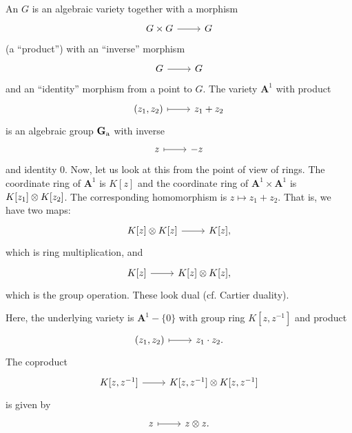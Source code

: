 \documentclass [11 pt, oneside] {article}
\begin{document}
\begin{example}\label{}
An  $G$ is an algebraic variety together with a morphism 
\[
\begin{tikzcd}
G\times G\ar[r]&G
\end{tikzcd}
\]
(a ``product'') with an ``inverse'' morphism
\[
\begin{tikzcd}
G\ar[r]&G
\end{tikzcd}
\]
 and an ``identity'' morphism from a point to $G$. The variety $\mathbf{A}^1$ with product
\[
\begin{tikzcd}
(z_1,z_2)\ar[r,mapsto]& z_1+z_2
\end{tikzcd}
\]
is an algebraic group $\mathbf G\textsubscript{a}$ with inverse
\[
\begin{tikzcd}
z\ar[r,mapsto]&-z
\end{tikzcd}
\]
and identity $0$. 
Now, let us look at this from the point of view of rings. 
The coordinate ring of $\mathbf{A}^1$ is $K[z]$ and the coordinate ring of $\mathbf{A}^1\times \mathbf{A}^1$ is $K[z_1]\otimes K[z_2]$. The corresponding homomorphism is $z\longmapsto z_1+z_2$. That is, we have two maps:
\[
\begin{tikzcd}
K[z]\tensor K[z]\ar[r]& K[z],
\end{tikzcd}
\]
which is ring multiplication, and 
\[
\begin{tikzcd}
K[z]\ar[r]& K[z]\tensor K[z],
\end{tikzcd}
\] 
which is the group operation. These look dual (cf. Cartier duality).
\end{example}

\begin{example}\label{}
Here, the underlying variety is $\mathbf{A}^1 - \{0\}$ with group ring $K[z,z^{-1}]$ and product 
\[
\begin{tikzcd}
(z_1,z_2)\ar[r,mapsto]& z_1\cdot z_2.
\end{tikzcd}
\]
The coproduct
\[
\begin{tikzcd}
K[z,z^{-1}] \ar[r]& K[z,z^{-1}]\tensor K[z,z^{-1}]
\end{tikzcd}
\]
is given by 
\[
\begin{tikzcd}
z\ar[r,mapsto]& z\tensor z.
\end{tikzcd}
\]
\end{example}
\end{document}
